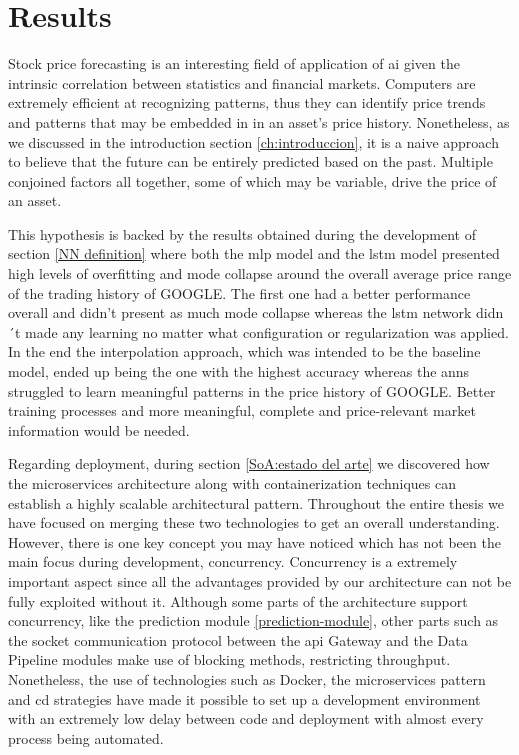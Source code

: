 \chapter{Results}
\label{res:resultados}

Stock price forecasting is an interesting field of application of \gls{ai} given the intrinsic correlation between statistics and financial markets. Computers are extremely efficient at recognizing patterns, thus they can identify price trends and patterns that may be embedded in in an asset's price history. Nonetheless, as we discussed in the introduction section \ref{ch:introduccion}, it is a naive approach to believe that the future can be entirely predicted based on the past. Multiple conjoined factors all together, some of which may be variable, drive the price of an asset.

This hypothesis is backed by the results obtained during the development of section \ref{NN definition} where both the \gls{mlp} model and the \gls{lstm} model presented high levels of overfitting and mode collapse around the overall average price range of the trading history of GOOGLE. The first one had a better performance overall and didn't present as much mode collapse whereas the \gls{lstm} network didn´t made any learning no matter what configuration or regularization was applied. In the end the interpolation approach, which was intended to be the baseline model, ended up being the one with the highest accuracy whereas the \glspl{ann} struggled to learn meaningful patterns in the price history of GOOGLE. Better training processes and more meaningful, complete and price-relevant market information would be needed.

Regarding deployment, during section \ref{SoA:estado del arte} we discovered how the microservices architecture along with containerization techniques can establish a highly scalable architectural pattern. Throughout the entire thesis we have focused on merging these two technologies to get an overall understanding. However, there is one key concept you may have noticed which has not been the main focus during development, concurrency. Concurrency is a extremely important aspect since all the advantages provided by our architecture can not be fully exploited without it. Although some parts of the architecture support concurrency, like the prediction module \ref{prediction-module}, other parts such as the socket communication protocol between the \gls{api} Gateway and the Data Pipeline modules make use of blocking methods, restricting throughput. Nonetheless, the use of technologies such as Docker, the microservices pattern and \gls{cd} strategies have made it possible to set up a development environment with an extremely low delay between code and deployment with almost every process being automated.
